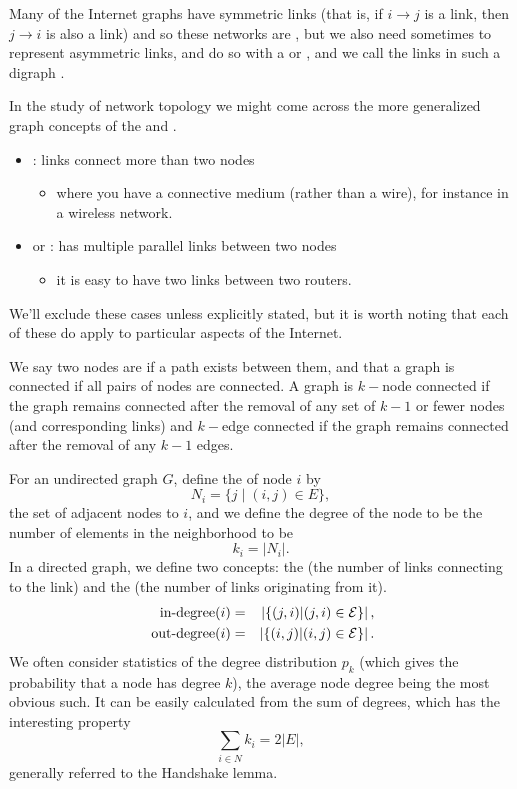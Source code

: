 Many of the Internet graphs have symmetric links (that is, if
$i\rightarrow j$ is a link, then $j \rightarrow i$ is also a link) and
so these networks are , but we also need sometimes
to represent asymmetric links, and do so with a  or , and we call the links in such a digraph
.

In the study of network topology we might come across the more
generalized graph concepts of the  and
. 
\begin{itemize}

  \item {}: links connect more than two nodes
    \begin{itemize}
    \item \eg where you have a connective medium (rather than a
      wire), for instance in a wireless network.
    \end{itemize}

  \item {} or : has multiple
    parallel links between two nodes
    \begin{itemize}
    \item \eg it is easy to have two links between two routers.
    \end{itemize}

\end{itemize}
We'll exclude these cases unless explicitly stated, but it is worth
noting that each of these do apply to particular aspects of the
Internet. 

We say two nodes are  if a path exists between them,
and that a graph is connected if all pairs of nodes are connected. A
graph is $k-$node connected if the graph remains connected after the
removal of any set of $k-1$ or fewer nodes (and corresponding links)
and $k-$edge connected if the graph remains connected after the
removal of any $k-1$ edges.

For an undirected graph $G$, define the  of node
$i$ by
     \[ N_i = \big\{ j \mid (i,j) \in E \big\}, \]
\ie the set of adjacent nodes to $i$, and we define the degree of
the node to be  the number of elements in the neighborhood to be 
     \[ k_i = |N_i |. \]
In a directed graph, we define two concepts: the 
(the number of links connecting to the link) and the
 (the number of links originating from it). 
\begin{eqnarray*}
  \mbox{ \rm in-degree}(i) & = & \left|  \{ (j,i) | (j,i) \in
                                     {\cal E}  \}   \right|, \\
  \mbox{ \rm out-degree}(i) & = & \left| \{ (i,j) | (i,j) \in
                                     {\cal E}  \}   \right|.
\end{eqnarray*}
We often consider statistics of the degree distribution $p_k$ (which
gives the probability that a node has degree $k$), the average node
degree being the most obvious such. It can be easily calculated from
the sum of degrees, which has the interesting property
    \[ \sum_{i \in N} k_i = 2 |E|, \]
generally referred to the Handshake lemma. 

